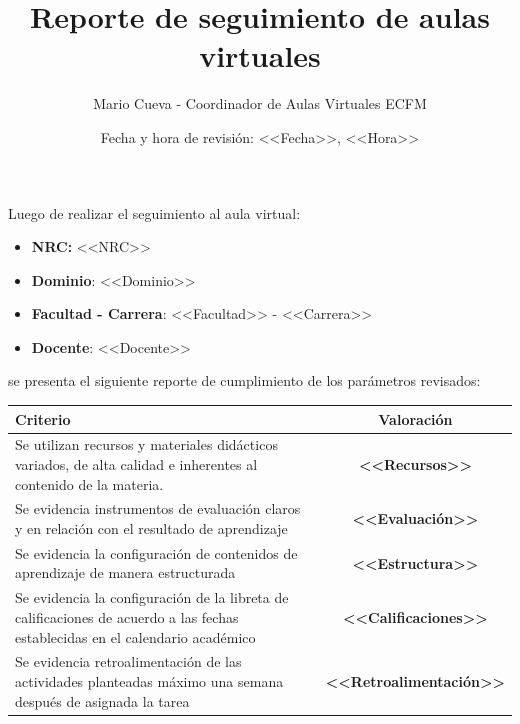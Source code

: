 \documentclass[11pt,a4paper]{article}
\title{\vspace{-2cm}\textbf{Reporte de seguimiento de aulas virtuales}}
\author{Mario Cueva - Coordinador de Aulas Virtuales ECFM}
\date{Fecha y hora de revisión: <<Fecha>>, <<Hora>>}
\begin{document}
\maketitle

\noindent
Luego de realizar el seguimiento al aula virtual:
\begin{itemize}
\item 
    \textbf{NRC:} <<NRC>>
\item 
    \textbf{Dominio}: <<Dominio>>
\item 
    \textbf{Facultad - Carrera}: <<Facultad>> - <<Carrera>>
\item 
    \textbf{Docente}: <<Docente>>
\end{itemize}
\noindent
se presenta el siguiente reporte de cumplimiento de los parámetros revisados:
\begin{center} \small
\begin{tabular}{@{}L{11cm}c@{}}
\toprule
    \textbf{Criterio} & \textbf{Valoración}\\
\midrule
    Se utilizan recursos y materiales didácticos variados, de alta calidad e inherentes al contenido de la materia.  & \textbf{<<Recursos>>} \\[5mm]
    Se evidencia instrumentos de evaluación claros y en relación con el resultado de aprendizaje  & \textbf{<<Evaluación>>} \\[5mm]
    Se evidencia  la  configuración  de contenidos de aprendizaje   de manera estructurada  & \textbf{<<Estructura>>} \\[5mm]
    Se evidencia la configuración de la libreta de calificaciones de acuerdo a las fechas establecidas en el calendario académico  & \textbf{<<Calificaciones>>} \\[5mm]
    Se evidencia  retroalimentación de las actividades planteadas máximo una semana después de asignada la tarea  & \textbf{<<Retroalimentación>>} \\
\bottomrule
\end{tabular}
\end{center}
\end{document}

